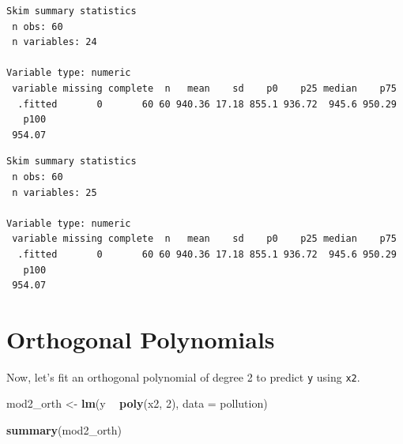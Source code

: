 \documentclass[]{book}
\newenvironment{Shaded}{\begin{snugshade}}{\end{snugshade}}
\newcommand{\KeywordTok}[1]{\textcolor[rgb]{0.13,0.29,0.53}{\textbf{#1}}}
\newcommand{\DataTypeTok}[1]{\textcolor[rgb]{0.13,0.29,0.53}{#1}}
\newcommand{\DecValTok}[1]{\textcolor[rgb]{0.00,0.00,0.81}{#1}}
\newcommand{\StringTok}[1]{\textcolor[rgb]{0.31,0.60,0.02}{#1}}
\newcommand{\OperatorTok}[1]{\textcolor[rgb]{0.81,0.36,0.00}{\textbf{#1}}}
\newcommand{\NormalTok}[1]{#1}
\theoremstyle{definition}
\theoremstyle{definition}
\theoremstyle{definition}
\theoremstyle{remark}
\begin{document}
\begin{Shaded}
\end{Shaded}

\begin{verbatim}
Skim summary statistics
 n obs: 60 
 n variables: 24 

Variable type: numeric 
 variable missing complete  n   mean    sd    p0    p25 median    p75
  .fitted       0       60 60 940.36 17.18 855.1 936.72  945.6 950.29
   p100
 954.07
\end{verbatim}

\begin{Shaded}
\end{Shaded}

\begin{verbatim}
Skim summary statistics
 n obs: 60 
 n variables: 25 

Variable type: numeric 
 variable missing complete  n   mean    sd    p0    p25 median    p75
  .fitted       0       60 60 940.36 17.18 855.1 936.72  945.6 950.29
   p100
 954.07
\end{verbatim}

\section{Orthogonal Polynomials}\label{orthogonal-polynomials}

Now, let's fit an orthogonal polynomial of degree 2 to predict
\texttt{y} using \texttt{x2}.

\begin{Shaded}
\begin{Highlighting}[]
\NormalTok{mod2_orth <-}\StringTok{ }\KeywordTok{lm}\NormalTok{(y }\OperatorTok{~}\StringTok{ }\KeywordTok{poly}\NormalTok{(x2, }\DecValTok{2}\NormalTok{), }\DataTypeTok{data =}\NormalTok{ pollution)}

\KeywordTok{summary}\NormalTok{(mod2_orth)}
\end{Highlighting}
\end{Shaded}
\end{document}

